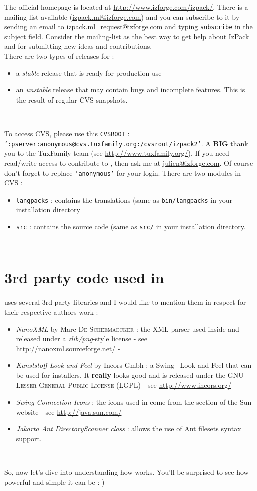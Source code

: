 The official \IzPack homepage is located at
\mbox{\url{http://www.izforge.com/izpack/}}. There is a mailing-list available 
(\url{izpack.ml@izforge.com}) and you can subscribe to it by sending an email to
\url{izpack.ml_request@izforge.com} and typing \texttt{subscribe} in the 
subject field. Consider the mailing-list as the best way to get help about
IzPack and for submitting new ideas and contributions.\\

There are two types of releases for \IzPack :
\begin{itemize}
  \item a \textit{stable} release that is ready for production use
  \item an \textit{unstable} release that may contain bugs and incomplete
  features. This is the result of regular CVS snapshots.
\end{itemize}\

To access CVS, please use this \texttt{CVSROOT} :\\
\texttt{':pserver:anonymous@cvs.tuxfamily.org:/cvsroot/izpack2'}. A \textbf{BIG}
thank you to the TuxFamily team (see \url{http://www.tuxfamily.org/}). If you need
read/write access to contribute to \IzPack, then ask me at
\url{julien@izforge.com}. Of course don't forget to replace \texttt{'anonymous'}
for your login. There are two modules in CVS :
\begin{itemize}
  \item \texttt{langpacks} : contains the translations (same as
  \texttt{bin/langpacks} in your \IzPack installation directory
  \item \texttt{src} : contains the source code (same as \texttt{src/} in your
  \IzPack installation directory.
\end{itemize}\

\section*{3rd party code used in \IzPack}

\IzPack uses several 3rd party libraries and I would like to mention them in
respect for their respective authors work :
\begin{itemize}
  \item \textit{NanoXML} by Marc \textsc{De Scheemaecker} : the XML parser used
  inside \IzPack and released under a \textit{zlib/png}-style license - see\\
  \url{http://nanoxml.sourceforge.net/} -
  \item \textit{Kunststoff Look and Feel} by Incors Gmbh : a Swing\texttrademark 
  \ Look and Feel
  that can be used for installers. It \textbf{really} looks good and
  is released under the \textsc{GNU Lesser General Public License (LGPL)} - see
  \url{http://www.incors.org/} -
  \item \textit{Swing Connection Icons} : the icons used in \IzPack come from
  the \Java section of the Sun website - see \url{http://java.sun.com/} -
  \item \textit{Jakarta Ant DirectoryScanner class} : allows the use of Ant
  filesets syntax support. 
\end{itemize}\

So, now let's dive into understanding how \IzPack works. You'll be
surprised to see how powerful and simple it can be :-)
